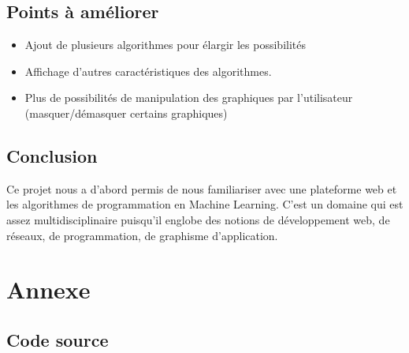 \documentclass[a4paper,11pt]{article}
\begin{document}
\subsection{Points à améliorer}
\begin{itemize}
    \item Ajout de plusieurs algorithmes pour élargir les possibilités

    \item Affichage d'autres caractéristiques des algorithmes.

    \item Plus de possibilités de manipulation des graphiques par l’utilisateur (masquer/démasquer certains graphiques)

\end{itemize}

\subsection{Conclusion}
Ce projet nous a d'abord permis de nous familiariser avec une plateforme web et les algorithmes
de programmation en Machine Learning. C'est un domaine qui est assez multidisciplinaire puisqu'il
englobe des notions de développement web, de réseaux, de programmation, de graphisme d'application.

    \section{Annexe}
\subsection{Code source}
    
\end{document}

